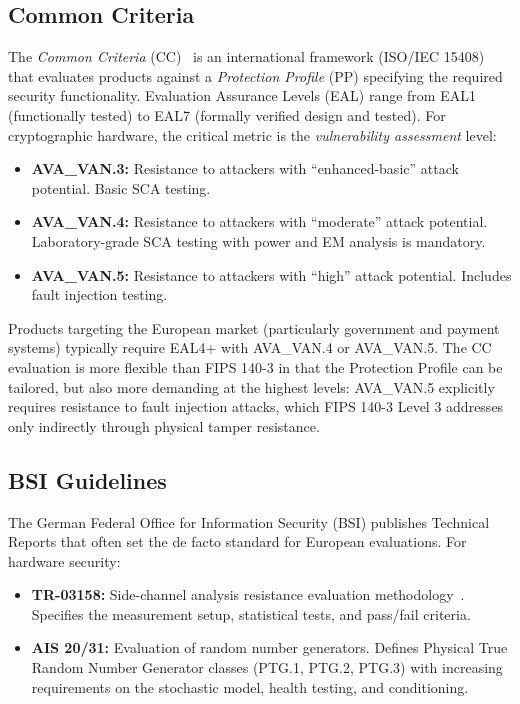 \subsection{Common Criteria}
\label{subsec:common-criteria}

The \emph{Common Criteria} (CC)~\cite{CommonCriteria2022} is an international framework (ISO/IEC 15408) that evaluates products against a \emph{Protection Profile} (PP) specifying the required security functionality.  Evaluation Assurance Levels (EAL) range from EAL1 (functionally tested) to EAL7 (formally verified design and tested).  For cryptographic hardware, the critical metric is the \emph{vulnerability assessment} level:

\begin{itemize}
\item \textbf{AVA\_VAN.3:}  Resistance to attackers with ``enhanced-basic'' attack potential.  Basic SCA testing.
\item \textbf{AVA\_VAN.4:}  Resistance to attackers with ``moderate'' attack potential.  Laboratory-grade SCA testing with power and EM analysis is mandatory.
\item \textbf{AVA\_VAN.5:}  Resistance to attackers with ``high'' attack potential.  Includes fault injection testing.
\end{itemize}

Products targeting the European market (particularly government and payment systems) typically require EAL4+ with AVA\_VAN.4 or AVA\_VAN.5.  The CC evaluation is more flexible than FIPS 140-3 in that the Protection Profile can be tailored, but also more demanding at the highest levels: AVA\_VAN.5 explicitly requires resistance to fault injection attacks, which FIPS 140-3 Level 3 addresses only indirectly through physical tamper resistance.

\subsection{BSI Guidelines}
\label{subsec:bsi}

The German Federal Office for Information Security (BSI) publishes Technical Reports that often set the de facto standard for European evaluations.  For hardware security:

\begin{itemize}
\item \textbf{TR-03158:}  Side-channel analysis resistance evaluation methodology~\cite{BSI-TR-03158}.  Specifies the measurement setup, statistical tests, and pass/fail criteria.
\item \textbf{AIS 20/31:}  Evaluation of random number generators.  Defines Physical True Random Number Generator classes (PTG.1, PTG.2, PTG.3) with increasing requirements on the stochastic model, health testing, and conditioning.
\end{itemize}

